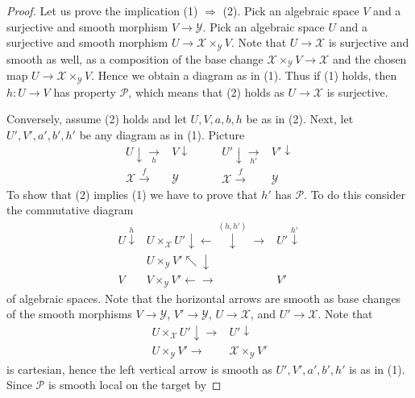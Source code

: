 \begin{proof}
Let us prove the implication (1) $\Rightarrow$ (2). Pick an algebraic
space $V$ and a surjective and smooth morphism $V \to \mathcal{Y}$.
Pick an algebraic space $U$ and a surjective and smooth morphism
$U \to \mathcal{X} \times_\mathcal{Y} V$. Note that $U \to \mathcal{X}$
is surjective and smooth as well, as a composition of the base change
$\mathcal{X} \times_\mathcal{Y} V \to \mathcal{X}$ and the chosen
map $U \to \mathcal{X} \times_\mathcal{Y} V$. Hence we obtain a
diagram as in (1). Thus if (1) holds, then $h : U \to V$ has property
$\mathcal{P}$, which means that (2) holds as $U \to \mathcal{X}$ is surjective.

\medskip\noindent
Conversely, assume (2) holds and let $U, V, a, b, h$ be as in (2).
Next, let $U', V', a', b', h'$ be any diagram as in (1).
Picture
$$
\begin{array}{cc}U \downarrow\underset{h}{\longrightarrow} & V \downarrow \\ \mathcal{X} \overset{f}{\longrightarrow} & \mathcal{Y}\end{array}
\quad\quad
\begin{array}{cc}U' \downarrow\underset{h'}{\longrightarrow} & V' \downarrow \\ \mathcal{X} \overset{f}{\longrightarrow} & \mathcal{Y}\end{array}
$$
To show that (2) implies (1) we have to prove that $h'$ has $\mathcal{P}$.
To do this consider the commutative diagram
$$
\begin{array}{ccc}U \overset{h}{\downarrow} & U \times_\mathcal{X} U' \downarrow\longleftarrow\overset{(h, h')}{\downarrow}\longrightarrow & U' \overset{h'}{\downarrow} \\  & U \times_\mathcal{Y} V' \nwarrow\downarrow &  \\ V & V \times_\mathcal{Y} V' \longleftarrow\longrightarrow & V'\end{array}
$$
of algebraic spaces. Note that the horizontal arrows are
smooth as base changes of the smooth morphisms
$V \to \mathcal{Y}$, $V' \to \mathcal{Y}$, $U \to \mathcal{X}$, and
$U' \to \mathcal{X}$. Note that
$$
\begin{array}{cc}U \times_\mathcal{X} U' \downarrow\longrightarrow & U' \downarrow \\ U \times_\mathcal{Y} V' \longrightarrow & \mathcal{X} \times_\mathcal{Y} V'\end{array}
$$
is cartesian, hence the left vertical arrow is smooth as
$U', V', a', b', h'$ is as in (1).
Since $\mathcal{P}$ is smooth local on the target by

\end{proof}
